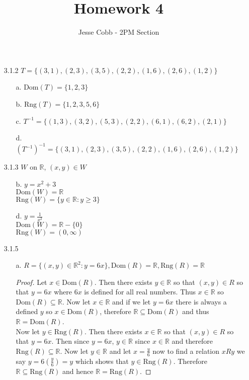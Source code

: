 \documentclass[11pt]{amsart}
\theoremstyle{definition}
\begin{document}
\title{Homework 4}

\author{Jesse Cobb - 2PM Section}

\maketitle

\begin{itemize}

\item[3.1.2] $T=\{(3,1),(2,3),(3,5),(2,2),(1,6),(2,6),(1,2)\}$
\begin{itemize}
    \item[a.] $\text{Dom}(T)=\{1,2,3\}$

    \item[b.] $\text{Rng}(T)=\{1,2,3,5,6\}$

    \item[c.] $T^{-1}=\{(1,3),(3,2),(5,3),(2,2),(6,1),(6,2),(2,1)\}$

    \item[d.] $(T^{-1})^{-1}=\{(3,1),(2,3),(3,5),(2,2),(1,6),(2,6),(1,2)\}$
    
\end{itemize}

\item[3.1.3] $W$ on $\mathbb{R}$, $(x,y)\in W$
\begin{itemize}
    \item[b.] $y=x^2+3$ \\
              $\text{Dom}(W)=\mathbb{R}$ \\
              $\text{Rng}(W)=\{y\in \mathbb{R}:y\ge 3\}$

    \item[d.] $y=\frac 1{x^2}$ \\
              $\text{Dom}(W)=\mathbb{R}-\{0\}$ \\
              $\text{Rng}(W)=(0,\infty)$

\end{itemize}

\item[3.1.5]
\begin{itemize}
    \item[a.] $R=\{(x,y)\in\mathbb{R}^2:y=6x\},\text{Dom}(R)=\mathbb{R},\text{Rng}(R)=\mathbb{R}$
    \begin{proof}
        Let $x\in\text{Dom}(R)$. Then there exists $y\in\mathbb{R}$ so that $(x,y)\in R$ so that $y=6x$ where $6x$ is defined for all real numbers. Thus $x\in\mathbb{R}$ so $\text{Dom}(R)\subseteq \mathbb{R}$. Now let $x\in\mathbb{R}$ and if we let $y=6x$ there is always a defined $y$ so $x\in\text{Dom}(R)$, therefore $\mathbb{R}\subseteq \text{Dom}(R)$ and thus $\mathbb{R}=\text{Dom}(R)$.\\
        Now let $y\in\text{Rng}(R)$. Then there exists $x\in\mathbb{R}$ so that $(x,y)\in R$ so that $y=6x$. Then since $y=6x$, $y\in\mathbb{R}$ since $x\in\mathbb{R}$ and therefore $\text{Rng}(R)\subseteq\mathbb{R}$. Now let $y\in\mathbb{R}$ and let $x=\frac y6$ now to find a relation $xRy$ we say $y=6(\frac y6)=y$ which shows that $y\in\text{Rng}(R)$. Therefore $\mathbb{R}\subseteq\text{Rng}(R)$ and hence $\mathbb{R}=\text{Rng}(R)$.
    \end{proof}


\end{itemize}
\end{itemize}
\end{document}
